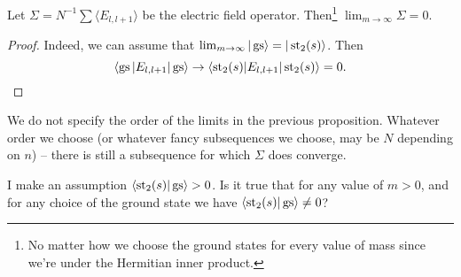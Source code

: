 \begin{corp}
Let $\Sigma = N^{-1}\sum \langle E_{l,l+1} \rangle$ be the electric field operator. Then\footnote{No matter how we choose the ground states for every value of mass since we're under the Hermitian inner product.} $\lim_{m \rightarrow \infty} \Sigma = 0$.
\end{corp}
\begin{proof}
Indeed, we can assume that $\lim_{m \rightarrow \infty} |\operatorname{gs}\rangle = |\operatorname{st}_2(s)\rangle$. Then 
\[
\langle \operatorname{gs} | E_{l,l+1} | \operatorname{gs} \rangle \rightarrow \langle \operatorname{st}_2(s) | E_{l,l+1}|\operatorname{st}_2(s)\rangle = 0.\qedhere
\]
\end{proof}
We do not specify the order of the limits in the previous proposition. Whatever order we choose (or whatever fancy subsequences we choose, may be $N$ depending on $n$) -- there is still a subsequence for which $\Sigma$ does converge. 

\begin{quest}
I make an assumption $\langle \operatorname{st}_2(s)|\operatorname{gs} \rangle > 0$. Is it true that for any value of $m > 0$, and for any choice of the ground state we have $\langle \operatorname{st}_2(s)|\operatorname{gs} \rangle \neq 0$?
\end{quest}

